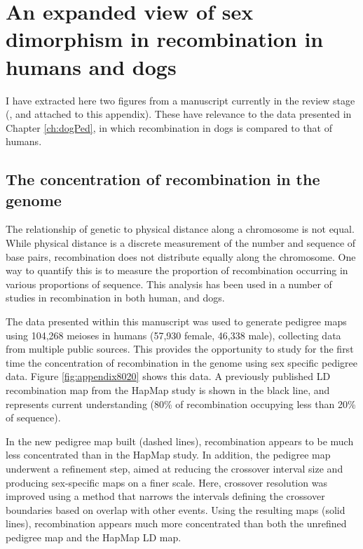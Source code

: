 
\beginappendixA

\section{An expanded view of sex dimorphism in recombination in humans and dogs}

I have extracted here two figures from a manuscript currently in the review stage (\citet{Bherer2016}, and attached to this appendix).
These have relevance to the data presented in Chapter \ref{ch:dogPed}, in which recombination in dogs is compared to that of humans.


\subsection{The concentration of recombination in the genome}
The relationship of genetic to physical distance along a chromosome is not equal.
While physical distance is a discrete measurement of the number and sequence of base pairs, recombination does not distribute equally along the chromosome.
One way to quantify this is to measure the proportion of recombination occurring in various proportions of sequence.
This analysis has been used in a number of studies in recombination in both human\cite{Myers2005,hapmap2007}, and dogs\cite{Auton2013}.

The data presented within this manuscript was used to generate pedigree maps using 104,268 meioses in humans (57,930 female, 46,338 male), collecting data from multiple public sources.
This provides the opportunity to study for the first time the concentration of recombination in the genome using sex specific pedigree data.
Figure \ref{fig:appendix8020} shows this data.
A previously published LD recombination map from the HapMap\cite{hapmap2007} study is shown in the black line, and represents current understanding (80\% of recombination occupying less than 20\% of sequence).

In the new pedigree map built (dashed lines), recombination appears to be much less concentrated than in the HapMap study.
In addition, the pedigree map underwent a refinement step, aimed at reducing the crossover interval size and producing sex-specific maps on a finer scale.
Here, crossover resolution was improved using a method that narrows the intervals defining the crossover boundaries based on overlap with other events.
Using the resulting maps (solid lines), recombination appears much more concentrated than both the unrefined pedigree map and the HapMap LD map.

